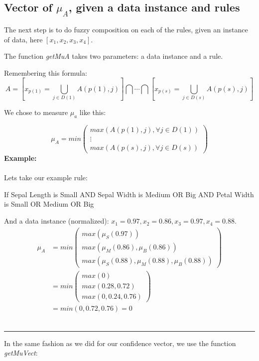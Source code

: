 \documentclass[a4paper,12pt]{article}
\begin{document}
\subsection{Vector of $\mu_A$, given a data instance and rules}

The next step is to do fuzzy composition on each of the rules, given an instance of data, here $[x_1,x_2,x_3,x_4]$.

The function \textit{getMuA} takes two parameters: a data instance and a rule.

Remembering this formula:
\[A=[x_{p(1)}=\bigcup_{j\in D(1)}A(p(1),j) ] \bigcap\cdots\bigcap[x_{p(s)}=\bigcup_{j\in D(s)}A(p(s),j)]\]

We chose to measure $\mu_a$ like this:

\[\mu_A=
min
\begin{pmatrix}
max(A(p(1),j),\forall j \in D(1))\\
\vdots \\
max(A(p(s),j),\forall j \in D(s))
\end{pmatrix}
    \]
\textbf{Example:}\\
\\
Lets take our example rule:
\begin{center}
If Sepal Length is Small AND Sepal Width is Medium OR Big AND Petal Width is Small OR Medium OR Big
\end{center}
And a data instance (normalized): $x_1=0.97,x_2=0.86,x_3=0.97,x_4=0.88$.\\
\[
\begin{split}
\mu_A &= min
\begin{pmatrix}
max(\mu_S(0.97))\\
max(\mu_M(0.86),\mu_B(0.86))\\
max(\mu_S(0.88),\mu_M(0.88),\mu_B(0.88))
\end{pmatrix}\\
&= min
\begin{pmatrix}
max(0)\\
max(0.28,0.72)\\
max(0,0.24,0.76)
\end{pmatrix}\\
&= min(0,0.72,0.76) = 0
\end{split}
\]
\\
\begin{center} \rule[1ex]{.5\textwidth}{.5pt} \end{center}
\newpage

In the same fashion as we did for our confidence vector, we use the function \textit{getMuVect}:
\end{document}
